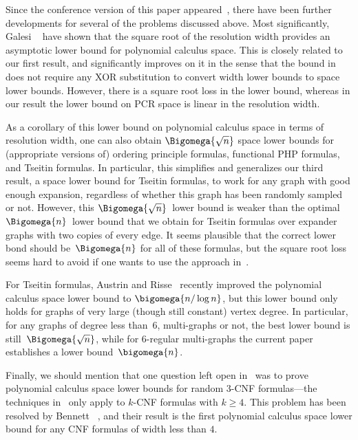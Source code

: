 
Since the conference version of this paper 
appeared~\cite{conf-version}, %
there have been further developments for several of the problems
discussed above. 
%
Most significantly,
Galesi \etal~\cite{GKT19SpaceWidth} have shown that
the square root of the resolution width provides an asymptotic lower
bound for polynomial calculus space.
This is closely related to our first result, and significantly
improves on it in the sense that the bound in~\cite{GKT19SpaceWidth}
does not require any XOR substitution to convert width lower bounds to
space lower bounds. However, there is a square root loss in the lower
bound, whereas in our result the lower bound on PCR space is linear in
the resolution width.

As a corollary of this lower bound on polynomial calculus space in
terms of resolution width, one can also obtain
$\Bigomega{\sqrt{n}}$
space lower bounds for (appropriate versions of)
ordering principle formulas, 
functional PHP formulas, 
and
Tseitin formulas.
%
In particular, this simplifies and generalizes our third result, a
space lower bound for Tseitin formulas, to work for any graph with
good enough expansion, regardless of whether this graph has been
randomly sampled or not.
%
However, this
$\Bigomega{\sqrt{n}}$~lower bound is weaker than the optimal 
$\Bigomega{n}$~lower bound that we obtain for Tseitin formulas over
expander graphs with two copies of every edge. It seems plausible that 
the correct lower bond should be~$\Bigomega{n}$
for all of these formulas, but the square root loss seems hard to
avoid if one wants to use the approach in~\cite{GKT19SpaceWidth}.

For Tseitin formulas, Austrin and Risse~\cite{AR22PerfectMatching}
recently improved the polynomial calculus space lower bound to
$\bigomega{n/\log n}$,
but this lower bound only holds for graphs of very large (though
still constant) vertex degree. In particular, for any graphs of degree less
than~$6$, multi-graphs or not, the best lower bound is 
still~$\Bigomega{\sqrt{n}}$,
while for $6$-regular multi-graphs the current paper establishes  a
lower bound~$\bigomega{n}$.

Finally, we should mention that one question left open
in~\cite{BG15Framework} was to prove polynomial calculus space lower
bounds for random \mbox{$3$-CNF} formulas---the techniques 
in~\cite{BG15Framework} only apply %
to  %
\mbox{$k$-CNF} formulas with 
$k \geq 4$. This problem has been resolved by
Bennett \etal~\cite{BBGHMW17SpaceProofCplx},
and their result is the first polynomial calculus space lower bound for
any CNF formulas of width less than $4$.

